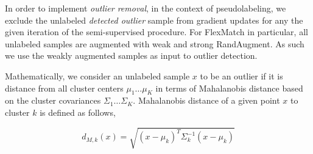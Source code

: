 \documentclass[10pt,twocolumn,letterpaper]{article}
\begin{document}
In order to implement \textit{outlier removal}, in the context of pseudolabeling, we exclude the unlabeled \textit{detected outlier} sample from gradient updates for any the given iteration of the semi-supervised procedure.  For FlexMatch in particular, all unlabeled samples are augmented with weak and strong RandAugment.  As such we use the weakly augmented samples as input to outlier detection.





%
%

Mathematically, we consider an unlabeled sample $x$ to be an outlier if it is distance from all cluster centers $\mu_1 \dots \mu_K$ in terms of Mahalanobis distance based on the cluster covariances $\Sigma_1 \dots \Sigma_K$.  Mahalanobis distance of a given point $x$ to cluster $k$ is defined as follows,

\begin{equation}
	d_{M,k}(x) = \sqrt{ \left(x - \mu_k\right)^T \Sigma_k^{-1} \left(x - \mu_k\right)  }
\end{equation}
\end{document}
